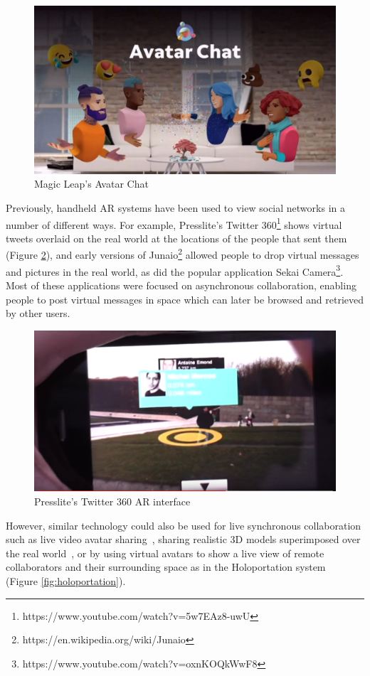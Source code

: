\begin{figure}
    \centering
    \includegraphics[width=.8\linewidth]{images/magic-leap-avatar-chat.jpg}
    \caption{Magic Leap's Avatar Chat}
    \label{fig:ml-avatar-chat}
\end{figure}


Previously, handheld AR systems have been used to view social networks in a number of different ways. For example, Presslite's Twitter 360\footnote{https://www.youtube.com/watch?v=5w7EAz8-uwU} shows virtual tweets overlaid on the real world at the locations of the people that sent them (Figure \ref{fig:presslite}), and early versions of Junaio\footnote{https://en.wikipedia.org/wiki/Junaio} allowed people to drop virtual messages and pictures in the real world, as did the popular application Sekai Camera\footnote{https://www.youtube.com/watch?v=oxnKOQkWwF8}. Most of these applications were focused on asynchronous collaboration, enabling people to post virtual messages in space which can later be browsed and retrieved by other users. 

\begin{figure}
    \centering
    \includegraphics[width=.8\linewidth]{images/Presslite-twitter-360.PNG}
    \caption{Presslite's Twitter 360 AR interface}
    \label{fig:presslite}
\end{figure}

However, similar technology could also be used for live synchronous collaboration such as live video avatar sharing~\citep{Billinghurst2002}, sharing realistic 3D models superimposed over the real world~\cite{Fanello2016}, or by using virtual avatars to show a live view of remote collaborators and their surrounding space as in the Holoportation system~\cite{Fanello2016} (Figure \ref{fig:holoportation}).

